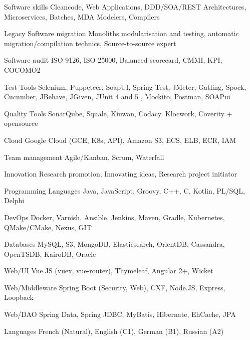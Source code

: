 

\begin{cvskills}

  \cvskill
  {Software skills} %
  {Cleancode, Web Applications, DDD/SOA/REST Architectures, Microservices, Batches, MDA Modelers, Compilers} %


  \cvskill
  {Legacy Software migration} %
  {Monoliths modularisation and testing, automatic migration/compilation technics, Source-to-source expert} %


  \cvskill
  {Software audit} %
  {ISO 9126, ISO 25000, Balanced scorecard, CMMI, KPI, COCOMO2} %

  \cvskill
  {Test Tools} %
  {Selenium, Puppeteer, SoapUI, Spring Test, JMeter, Gatling, Spock, Cucumber, JBehave, JGiven, JUnit 4 and 5 , Mockito, Postman, SOAPui} %

  \cvskill
  {Quality Tools} %
  {SonarQube, Squale, Kiuwan, Codacy, Klocwork, Coverity + opensource} %


  \cvskill
  {Cloud} %
  {Google Cloud (GCE, K8s, API), Amazon S3, ECS, ELB, ECR, IAM} %


  \cvskill
  {Team management} %
  {Agile/Kanban, Scrum, Waterfall} %

  \cvskill
  {Innovation} %
  {Research promotion, Innovating ideas, Research project initiator} %

  \cvskill
  {Programming Languages} %
  {Java, JavaScript, Groovy, C++, C, Kotlin, PL/SQL, Delphi} %
  
  \cvskill
  {DevOps} %
  {Docker, Varnish, Ansible, Jenkins, Maven, Gradle, Kubernetes, QMake/CMake, Nexus, GIT} %
  
  \cvskill
  {Databases} %
  {MySQL, S3, MongoDB, Elasticsearch, OrientDB, Cassandra, OpenTSDB, KairoDB, Oracle} %
  
  \cvskill
  {Web/UI} %
  {Vue.JS (vuex, vue-router), Thymeleaf, Angular 2+, Wicket} %
  
  \cvskill
  {Web/Middleware} %
  {Spring Boot (Security, Web), CXF, Node.JS, Express, Loopback} %
  
  
  \cvskill
  {Web/DAO} %
  {Spring Data, Spring JDBC, MyBatis, Hibernate, EhCache, JPA} %
  

  \cvskill
    {Languages} %
    {French (Natural), English (C1), German (B1), Russian (A2)} %

\end{cvskills}
